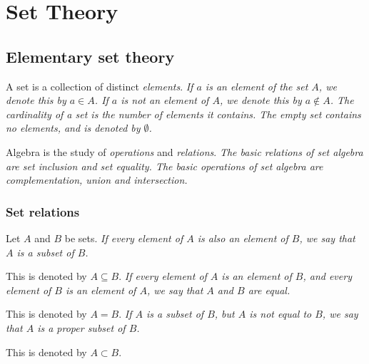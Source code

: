\chapter{Set Theory}\label{chap:sets}

\section{Elementary set theory}

A set is a collection of distinct \emph{elements}.
\bit
\it If $a$ is an element of the set $A$, we denote this by $a\in A$.
\it If $a$ is \emph{not} an element of $A$, we denote this by $a\notin A$.
\it The \emph{cardinality} of a set is the number of elements it contains.
\it The \emph{empty set} contains no elements, and is denoted by $\emptyset$.
\eit

Algebra is the study of \emph{operations} and \emph{relations}.
\bit
\it The basic relations of set algebra are \emph{set inclusion} and \emph{set equality}.
\it The basic operations of set algebra are \emph{complementation}, \emph{union} and \emph{intersection}.
\eit

\break
\subsection{Set relations}

\begin{definition}
Let $A$ and $B$ be sets. 
\ben
\it If every element of $A$ is also an element of $B$, we say that $A$ is a \emph{subset} of $B$.
\par This is denoted by $A\subseteq B$.
\it If every element of $A$ is an element of $B$, and every element of $B$ is an element of $A$, we say that $A$ and $B$ are \emph{equal}. 
\par This is denoted by $A=B$.
\it If $A$ is a subset of $B$, but $A$ is not equal to $B$, we say that $A$ is a \emph{proper subset} of $B$. 
\par This is denoted by $A\subset B$.
\een
\end{definition}

